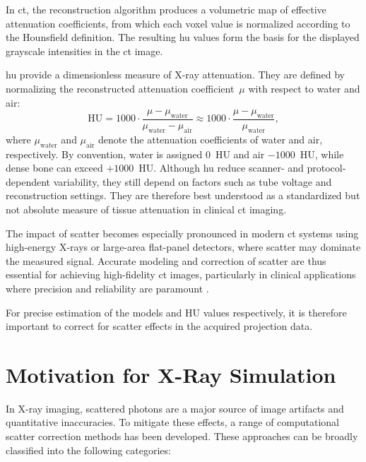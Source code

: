 In \ac{ct}, the reconstruction algorithm produces a volumetric map of effective
attenuation coefficients, from which each voxel value is normalized according to
the Hounsfield definition. The resulting \ac{hu} values form the basis for the
displayed grayscale intensities in the \ac{ct} image.

\acs{hu} provide a dimensionless measure of X-ray attenuation. They are defined
by normalizing the reconstructed attenuation coefficient~$\mu$ with respect to
water and air:
\begin{equation}
    \mathrm{HU} = 1000 \cdot \frac{\mu - \mu_\text{water}}{\mu_\text{water} - \mu_\text{air}}
    \approx 1000 \cdot \frac{\mu - \mu_\text{water}}{\mu_\text{water}},
\end{equation}
where $\mu_\text{water}$ and $\mu_\text{air}$ denote the attenuation
coefficients of water and air, respectively. By convention, water is assigned
$0$~HU and air $-1000$~HU, while dense bone can exceed $+1000$~HU. Although
\ac{hu} reduce scanner- and protocol-dependent variability, they still depend on
factors such as tube voltage and reconstruction settings. They are therefore
best understood as a standardized but not absolute measure of tissue attenuation
in clinical \ac{ct} imaging.

The impact of scatter becomes especially pronounced in modern \ac{ct} systems
using high-energy X-rays or large-area flat-panel detectors, where scatter may
dominate the measured signal. Accurate modeling and correction of scatter are
thus essential for achieving high-fidelity \ac{ct} images, particularly in
clinical applications where precision and reliability are paramount
\citep{medicalImagingSystemsIntro2019:}.

For precise estimation of the models and \ac{HU} values respectively, it is therefore
important to correct for scatter effects in the acquired projection data.


\section{Motivation for X-Ray Simulation}

In X-ray imaging, scattered photons are a major source of image artifacts and
quantitative inaccuracies. To mitigate these effects, a range of computational
scatter correction methods has been developed. These approaches can be broadly
classified into the following categories:

